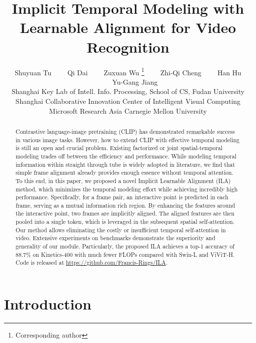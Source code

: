 \documentclass[10pt,twocolumn,letterpaper]{article}
\begin{document}
\title{Implicit Temporal Modeling with Learnable Alignment for Video Recognition}

\author{Shuyuan Tu \ \ \ \ 
Qi Dai \ \ \ \ 
Zuxuan Wu \thanks{Corresponding author} \ \ \ \
Zhi-Qi Cheng \ \ \ \ 
Han Hu \ \ \ \ 
Yu-Gang Jiang \vspace{0.1in}\\
{Shanghai Key Lab of Intell. Info. Processing, School of CS, Fudan University} \\
{Shanghai Collaborative Innovation Center of Intelligent Visual Computing} \\
{Microsoft Research Asia}  \quad 
{Carnegie Mellon University} 
}

\maketitle
\ificcvfinal\thispagestyle{empty}\fi

\begin{abstract}
Contrastive language-image pretraining (CLIP) has demonstrated remarkable success in various image tasks. 
However, how to extend CLIP with effective temporal modeling is still an open and crucial problem. 
Existing factorized or joint spatial-temporal modeling trades off between the efficiency and performance. 
While modeling temporal information within straight through tube is widely adopted in literature, we find that simple frame alignment already provides enough essence without temporal attention. 
To this end, in this paper, we proposed a novel Implicit Learnable Alignment (ILA) method, which minimizes the temporal modeling effort while achieving incredibly high performance. 
Specifically, for a frame pair, an interactive point is predicted in each frame, serving as a mutual information rich region. 
By enhancing the features around the interactive point, two frames are implicitly aligned. 
The aligned features are then pooled into a single token, which is leveraged in the subsequent spatial self-attention. 
Our method allows eliminating the costly or insufficient temporal self-attention in video. 
Extensive experiments on benchmarks demonstrate the superiority and generality of our module. 
Particularly, the proposed ILA achieves a top-1 accuracy of 88.7\% on Kinetics-400 with much fewer FLOPs compared with Swin-L and ViViT-H.
Code is released at \url{https://github.com/Francis-Rings/ILA}.
\end{abstract}

\section{Introduction}
\end{document}
